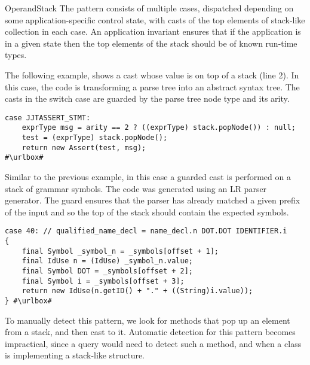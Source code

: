 \begin{pattern}{OperandStack}
The \thisp{} pattern consists of multiple cases,
dispatched depending on some application-specific control state,
with casts of the top elements of stack-like collection in each case.
An application invariant ensures that if the application is in a given 
state then the top elements of the stack should be of known run-time types.

\instances{}
The following example,
shows a cast whose value is on top of a stack (line 2).
In this case,
the code is transforming a parse tree into an abstract syntax tree.
The casts in the switch case are guarded by the parse tree node type and
its arity. 

\def\urlvar{http://bit.ly/fabioz_Pydev_2HF6nrF}
\begin{verbatim}
case JJTASSERT_STMT:
    exprType msg = arity == 2 ? ((exprType) stack.popNode()) : null;
    test = (exprType) stack.popNode();
    return new Assert(test, msg);
#\urlbox#
\end{verbatim}

Similar to the previous example,
in this case a guarded cast is performed on a stack of grammar symbols.
The code was generated using an LR parser generator.
The guard ensures that the parser has already matched a given prefix of the
input and so the top of the stack should contain the expected symbols.

\def\urlvar{http://bit.ly/Sable_soot_2MZLZ3m}
\begin{verbatim}
case 40: // qualified_name_decl = name_decl.n DOT.DOT IDENTIFIER.i
{
    final Symbol _symbol_n = _symbols[offset + 1];
    final IdUse n = (IdUse) _symbol_n.value;
    final Symbol DOT = _symbols[offset + 2];
    final Symbol i = _symbols[offset + 3];
    return new IdUse(n.getID() + "." + ((String)i.value));
} #\urlbox#
\end{verbatim}


\detection{}
To manually detect this pattern,
we look for methods that pop up an element from a stack,
and then cast to it.
Automatic detection for this pattern becomes impractical,
since a query would need to detect such a method,
and when a class is implementing a stack-like structure.



\end{pattern}
